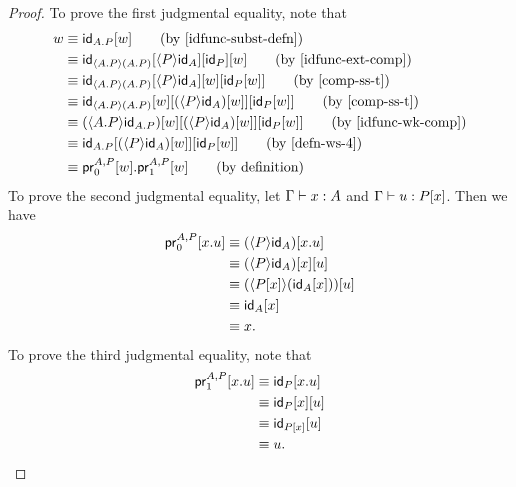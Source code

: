\begin{proof}
To prove the first judgmental equality, note that
\begin{align*}
w & \jdeq \subst{w}{\idfunc[\ctxext{A}{P}]} \tag{by \autoref{idfunc-subst-defn}}\\
& \jdeq \subst{w}{\subst{\idfunc[P]}{{\ctxwk{P}{\idfunc[A]}}{\idfunc[\ctxwk{\ctxext{A}{P}}{\ctxext{A}{P}}]}}}
  \tag{by \autoref{idfunc-ext-comp}}\\
& \jdeq \subst{{w}{\idfunc[P]}}{\subst{w}{{\ctxwk{P}{\idfunc[A]}}{\idfunc[\ctxwk{\ctxext{A}{P}}{\ctxext{A}{P}}]}}}\tag{by \autoref{comp-ss-t}}\\
& \jdeq \subst{{w}{\idfunc[P]}}{{\subst{w}{\ctxwk{P}{\idfunc[A]}}}{\subst{w}{\idfunc[\ctxwk{\ctxext{A}{P}}{\ctxext{A}{P}}]}}}\tag{by \autoref{comp-ss-t}}\\
& \jdeq \subst{{w}{\idfunc[P]}}{{\subst{w}{\ctxwk{P}{\idfunc[A]}}}{\subst{w}{\ctxwk{\ctxext{A}{P}}{\idfunc[\ctxext{A}{P}]}}}}\tag{by \autoref{idfunc-wk-comp}}\\
& \jdeq \subst{{w}{\idfunc[P]}}{{\subst{w}{\ctxwk{P}{\idfunc[A]}}}{\idfunc[\ctxext{A}{P}]}}\tag{by \autoref{defn-ws-4}}\\
& \jdeq \ctxext{\cprojfst{A}{P}{w}}{\cprojsnd{A}{P}{w}}\tag{by definition}
\end{align*}
To prove the second judgmental equality, let $\jterm{\Gamma}{A}{x}$ and
$\jterm{\Gamma}{\subst{x}{P}}{u}$. Then we have
\begin{align*}
\cprojfst{A}{P}{\ctxext{x}{u}}
& \jdeq \subst{\ctxext{x}{u}}{\ctxwk{P}{\idfunc[A]}}\\
& \jdeq \subst{u}{{x}{\ctxwk{P}{\idfunc[A]}}} \\
& \jdeq \subst{u}{\ctxwk{\subst{x}{P}}{\subst{x}{\idfunc[A]}}}\\
& \jdeq \subst{x}{\idfunc[A]}\\
& \jdeq x.
\end{align*}
To prove the third judgmental equality, note that
\begin{align*}
\cprojsnd{A}{P}{\ctxext{x}{u}}
& \jdeq \subst{\ctxext{x}{u}}{\idfunc[P]}\\
& \jdeq \subst{u}{{x}{\idfunc[P]}}\\
& \jdeq \subst{u}{\idfunc[\subst{x}{P}]}\\
& \jdeq u.
\end{align*}
\end{proof}

